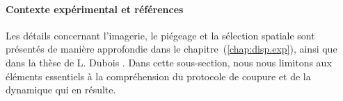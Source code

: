 \paragraph{Contexte expérimental et références}
Les détails concernant l’imagerie, le piégeage et la sélection spatiale sont présentés de manière approfondie dans le {chapitre~(\ref{chap:disp.exp})}, ainsi que dans la thèse de L. Dubois \cite{L.Dubois2024}. Dans cette sous-section, nous nous limitons aux éléments essentiels à la compréhension du protocole de coupure et de la dynamique qui en résulte.


%
%


